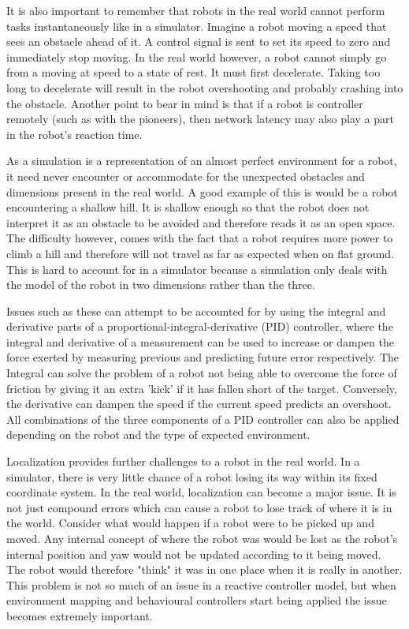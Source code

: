 \documentclass{article}
\begin{document}
It is also important to remember that robots in the real world cannot perform tasks instantaneously like in a simulator.
Imagine a robot moving a speed that sees an obstacle ahead of it. A control signal is sent to set its speed to zero 
and immediately stop moving. In the real world however, a robot cannot simply go from a moving at speed to a state 
of rest. It must first decelerate. Taking too long to decelerate will result in the robot overshooting and probably 
crashing into the obstacle. Another point to bear in mind is that if a robot is controller remotely (such as with the 
pioneers), then network latency may also play a part in the robot's reaction time.

As a simulation is a representation of an almost perfect environment for a robot, it need never encounter or accommodate
for the unexpected obstacles and dimensions present in the real world. A good example of this is would be a 
robot encountering a shallow hill. It is shallow enough so that the robot does not interpret it as an obstacle to be 
avoided and therefore reads it as an open space. The difficulty however, comes with the fact that a robot requires 
more power to climb a hill and therefore will not travel as far as expected when on flat ground. This is hard to 
account for in a simulator because a simulation only deals with the model of the robot in two dimensions rather than 
the three.

Issues such as these can attempt to be accounted for by using the integral and derivative parts of a proportional-integral-derivative 
(PID) controller, where the integral and derivative of a measurement can be used to increase or dampen the force 
exerted by measuring previous and predicting future error respectively. The Integral can solve the problem of a robot 
not being able to overcome the force of friction by giving it an extra 'kick' if it has fallen short of the target. 
Conversely, the derivative can dampen the speed if the current speed predicts an overshoot. All combinations of the 
three components of a PID controller can also be applied depending on the robot and the type of expected environment.

Localization provides further challenges to a robot in the real world. In a simulator, there is very little chance 
of a robot losing its way within its fixed coordinate system. In the real world, localization can become a major issue. 
It is not just compound errors which can cause a robot to lose track of where it is in the world. Consider what would happen 
if a robot were to be picked up and moved. Any internal concept of where the robot was would be lost as the robot's 
internal position and yaw would not be updated according to it being moved. The robot would therefore "think" it was 
in one place when it is really in another. This problem is not so much of an issue in a reactive controller model, 
but when environment mapping and behavioural controllers start being applied the issue becomes extremely important. 
\end{document}
